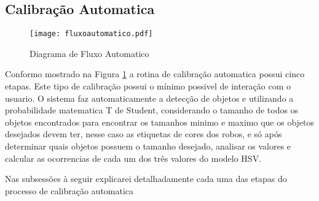 	\subsection{Calibração Automatica}	
		\begin{figure}[!h]
					\centering
					\texttt{[image: fluxoautomatico.pdf]}
					\caption{Diagrama de Fluxo Automatico}
					\label{DiagramaDeFluxoAutomatico}
				\end{figure} 
		Conformo mostrado na Figura \ref{DiagramaDeFluxoAutomatico} a rotina de calibração automatica possui cinco etapas. Este tipo de calibração  possui o mínimo possivel de interação com o usuario. O sistema faz automaticamente a detecção de objetos e utilizando a probabilidade matematica T de Student, considerando o tamanho de todos os objetos encontrados para encontrar os tamanhos minimo e maximo que os objetos desejados devem ter, nesse caso as etiquetas de cores dos robos, e só após determinar quais objetos possuem o tamanho desejado, analisar os valores e calcular as ocorrencias de cada um dos três valores do modelo HSV.
			
	
			
	Nas subsessões à seguir explicarei detalhadamente cada uma das etapas do processo de calibração automatica
